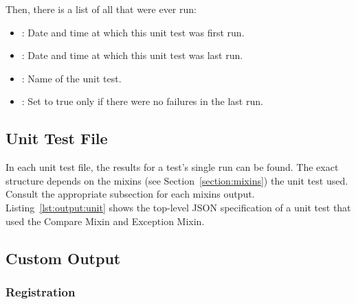Then, there is a list of all  that were ever run:

\begin{itemize}
\item {}: Date and time at which this unit test was first run.
\item {}: Date and time at which this unit test was last run.
\item {}: Name of the unit test.
\item {}: Set to true only if there were no failures in the last run.
\end{itemize}



\subsection{Unit Test File}
\label{section:output:unit}

In each unit test file, the results for a test's single run can be found. The exact structure depends on the mixins (see Section~\ref{section:mixins}) the unit test used. Consult the appropriate subsection for each mixins output. Listing~\ref{lst:output:unit} shows the top-level JSON specification of a unit test that used the Compare Mixin and Exception Mixin.



\subsection{Custom Output}
\label{section:output:custom}


\subsubsection{Registration}
\label{section:output:custom:register}

